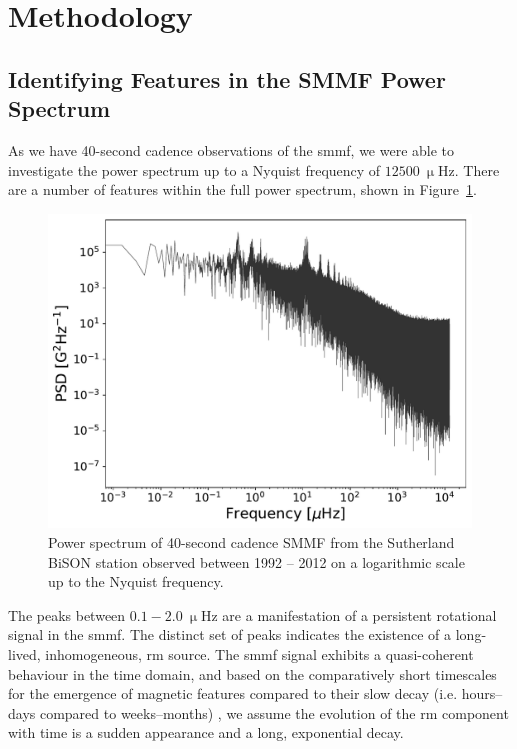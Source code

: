 \section{Methodology}\label{sec:SMMF_method}


\subsection{Identifying Features in the SMMF Power Spectrum}

As we have 40-second cadence observations of the \gls{smmf}, we were able to investigate the power spectrum up to a Nyquist frequency of $12500~\upmu\mathrm{Hz}$. There are a number of features within the full power spectrum, shown in Figure~\ref{fig:BiSON_FT_full}.

\begin{figure}[ht!]
	\centering
	\includegraphics[width=\columnwidth]{BiSON_SMMF_FT_full.pdf}
	\caption{Power spectrum of 40-second cadence SMMF from the Sutherland BiSON station observed between 1992 -- 2012 on a logarithmic scale up to the Nyquist frequency.}
	\label{fig:BiSON_FT_full}
\end{figure}

The peaks between $0.1-2.0~\upmu\mathrm{Hz}$ are a manifestation of a persistent rotational signal in the \gls{smmf}. The distinct set of peaks indicates the existence of a long-lived, inhomogeneous, \gls{rm} source. The \gls{smmf} signal exhibits a quasi-coherent behaviour in the time domain, and based on the comparatively short timescales for the emergence of magnetic features compared to their slow decay (i.e. hours--days compared to weeks--months) \citep{zwaan_solar_1981, harvey_properties_1993, hathaway_sunspot_2008, dacie_evolution_2016}, we assume the evolution of the \gls{rm} component with time is a sudden appearance and a long, exponential decay.

